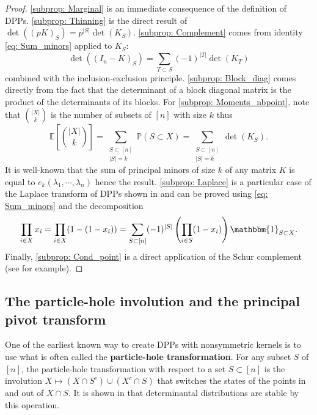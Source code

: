 \documentclass{article}
\numberwithin{equation}{section}
\newcommand{\bE}{\mathbb{E}}
\newcommand{\cara}[1]{\mathbbm{1}_{#1}}
\theoremstyle{plain}
\begin{document}
\begin{proof}
\ref{subprop: Marginal} is an immediate consequence of the definition of DPPs. \ref{subprop: Thinning} is the direct result of $\det((pK)_S)=p^{|S|}\det(K_S)$. \ref{subprop: Complement} comes from identity \eqref{eq: Sum_minors} applied to $K_S$:
\[\det((I_n-K)_S)=\sum_{T\subset S}(-1)^{|T|}\det(K_T)\]
combined with the inclusion-exclusion principle. \ref{subprop: Block_diag} comes directly from the fact that the determinant of a block diagonal matrix is the product of the determinants of its blocks. For \ref{subprop: Moments_nbpoint}, note that $\binom{|X|}{k}$ is the number of subsets of $[n]$ with size $k$ thus 
\[\bE\left[\binom{|X|}{k}\right]=\sum_{\substack{S\subset [n]\\ |S|=k}}\mathbb{P}(S\subset X)=\sum_{\substack{S\subset [n]\\ |S|=k}}\det(K_S).\]
It is well-known \cite[Theorem 1.2.16]{Horn} that the sum of principal minors of size $k$ of any matrix $K$ is equal to $e_k(\lambda_1,\cdots,\lambda_n)$ hence the result. \ref{subprop: Laplace} is a particular case of the Laplace transform of DPPs shown in \cite{Shirai} and can be proved using \eqref{eq: Sum_minors} and the decomposition
\[\prod_{i\in X} x_i=\prod_{i\in X} (1-(1-x_i))=\sum_{S\subset [n]}(-1)^{|S|}\left(\prod_{i\in S}(1-x_i)\right)\cara{S\subset X}.\]
Finally, \ref{subprop: Cond_point} is a direct application of the Schur complement (see \cite[Theorem 6.5]{Shirai} for example).
\end{proof}

\subsection{The particle-hole involution and the principal pivot transform}

One of the earliest known way to create DPPs with nonsymmetric kernels is to use what is often called the \textbf{particle-hole transformation}. For any subset $S$ of $[n]$, the particle-hole transformation with respect to a set $S\subset [n]$ is the involution $X \mapsto (X\cap S^c)\cup(X^c\cap S)$ that switches the states of the points in and out of $X\cap S$. It is shown in \cite{Borodin99} that determinantal distributions are stable by this operation.
\end{document}
